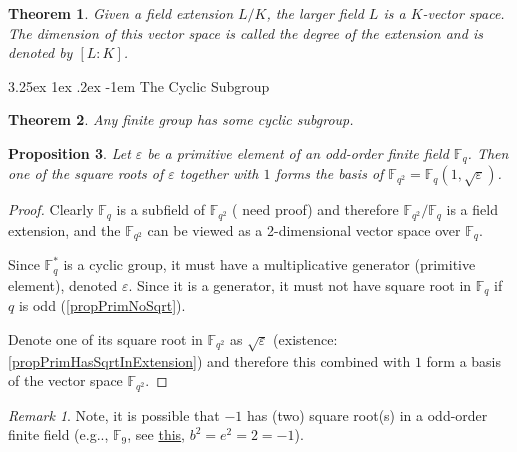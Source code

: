 \documentclass[12pt, letterpaper]{article}
\makeatletter
\newcommand{\field}{\mathbb{F}}
\newcommand\eg{e.g\@ifnextchar.{}{.\@}}
\newcommand{\red}[1]{{\color{red} #1}}
\newtheorem{prop}{Proposition}[section]
\newtheorem{thm}[prop]{Theorem}
\renewcommand\paragraph{\@startsection{paragraph}{4}{\z@}%
	{3.25ex \@plus1ex \@minus.2ex}%
	{-1em}%
	{\normalfont\normalsize\bfseries}}
\theoremstyle{definition}
\theoremstyle{remark}
\newtheorem*{rem*}{Remark}
\theoremstyle{definition}
\theoremstyle{plain}
\numberwithin{equation}{section}
\makeatother
\begin{document}
	\begin{thm}
		Given a field extension $L / K$,
		the larger field $L$ is a $K$-vector space.
		The dimension of this vector space is called the degree of the extension and is denoted by $[L : K]$.
	\end{thm}
	\paragraph{The Cyclic Subgroup}
	\begin{thm}
		Any finite group has some cyclic subgroup.
	\end{thm}

	\begin{prop}
		Let $\varepsilon$ be a primitive element of an odd-order finite field $\field_q$.
		Then one of the square roots of $\varepsilon$ together with $1$ forms the basis of $\field_{q^2}=\field_q(1,\sqrt{\varepsilon})$.
	\end{prop}
	\begin{proof}
		Clearly $\field_q$ is a subfield of $\field_{q^2}$ (\red{need proof})
		and therefore $\field_{q^2}/\field_q$ is a field extension,
		and the $\field_{q^2}$ can be viewed as a 2-dimensional vector space over $\field_q$.
		
		Since $\field_q^*$ is a cyclic group, it must have a multiplicative generator (primitive element), denoted $\varepsilon$.
		Since it is a generator, it must not have square root in $\field_q$ if $q$ is odd (\autoref{propPrimNoSqrt}).
		
		Denote one of its square root in $\field_{q^2}$ as $\sqrt{\varepsilon}$ (existence: \autoref{propPrimHasSqrtInExtension})
		and therefore this combined with $1$
		form a basis of the vector space $\field_{q^2}$.
	\end{proof}
	\begin{rem*}
		Note, it is possible that $-1$ has (two) square root(s) in a odd-order finite field (\eg, $\field_9$, 
		see \href{https://www.chegg.com/homework-help/questions-and-answers/11-let-f9-finite-field-9-elements-addition-multiplication-tables-f9-given-next-page-descri-q13298041}{this}, $b^2=e^2=2=-1$).
	\end{rem*}
\end{document}

